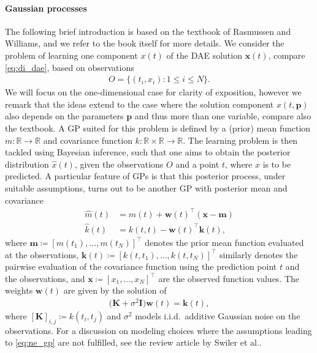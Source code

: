 \documentclass[AMA,STIX1COL]{WileyNJD-v2}
\newcommand{\mb}[1]{\mathbf{#1}}
\newcommand{\T}{{\!\top}}
\begin{document}
\paragraph{Gaussian processes}
The following brief introduction is based on the textbook of Rasmussen and Williams\cite{rasmussen2006}, and we refer to the book itself for more details. We consider the problem of learning one component $x(t)$ of the DAE solution $\mb{x}(t)$, compare \eqref{eq:di_dae}, based on observations
\begin{align*}
    O = \big\{ (t_i, x_i): 1 \leq i \leq N \big\}.
\end{align*}
We will focus on the one-dimensional case for clarity of exposition, however we remark that the ideas extend to the case where the solution component $x(t, \mb{p})$ also depends on the parameters $\mb{p}$ and thus more than one variable, compare also the textbook\cite{rasmussen2006}. A GP suited for this problem is defined by a (prior) mean function $m: \mathbb{R} \to \mathbb{R}$ and covariance function $k: \mathbb{R} \times \mathbb{R} \to \mathbb{R}$. The learning problem is then tackled using Bayesian inference, such that one aims to obtain the posterior distribution $\hat{x}(t)$, given the observations $O$ and a point $t$, where $x$ is to be predicted. A particular feature of GPs is that this posterior process, under suitable assumptions, turns out to be another GP with posterior mean and covariance\cite{basak2021}
\begin{subequations}
    \label{eq:ne_gp}
    \begin{align}
        \hat{m}(t) &= m(t) + \mb{w}(t)^\T (\mb{x} - \mb{m}) \label{eq:ne_gpa}\\
        \hat{k}(t) &= k(t, t) - \mb{w}(t)^\T \mb{k}(t) \label{eq:ne_gpb},
    \end{align}
\end{subequations}
where $\mb{m} \coloneqq [m(t_1), \dotsc, m(t_N)]^\T$ denotes the prior mean function evaluated at the observations, $\mb{k}(t) \coloneqq [k(t, t_1), \dotsc, k(t, t_N)]^\T$ similarly denotes the pairwise evaluation of the covariance function using the prediction point $t$ and the observations, and $\mb{x} \coloneqq [x_1, \dotsc, x_N]^\T$ are the observed function values. The weights $\mb{w}(t)$ are given by the solution of
\begin{align*}
    \big( \mb{K} + \sigma^2 \mb{I} \big) \mb{w}(t) = \mb{k}(t),
\end{align*}
where $[\mb{K}]_{i,j} \coloneqq k(t_i, t_j)$ and $\sigma^2$ models i.i.d.~additive Gaussian noise on the observations. For a discussion on modeling choices where the assumptions leading to \eqref{eq:ne_gp} are not fulfilled, see the review article by Swiler et al.\cite{swiler2020}.
\end{document}
